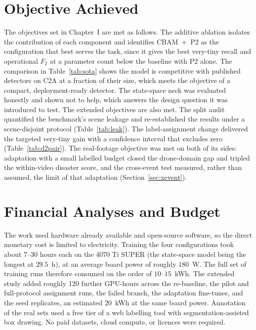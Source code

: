 \section{Objective Achieved}
The objectives set in Chapter~I are met as follows. The additive ablation isolates
the contribution of each component and identifies CBAM~+~P2 as the configuration
that best serves the task, since it gives the best very-tiny recall and operational
$F_2$ at a parameter count below the baseline with P2 alone. The comparison in
Table~\ref{tab:sota} shows the model is competitive with published detectors on C2A
at a fraction of their size, which meets the objective of a compact,
deployment-ready detector. The state-space neck was evaluated honestly and shown not
to help, which answers the design question it was introduced to test. The extended
objectives are also met. The split audit quantified the benchmark's scene leakage
and re-established the results under a scene-disjoint protocol
(Table~\ref{tab:leak}). The label-assignment change delivered the targeted
very-tiny gain with a confidence interval that excludes zero
(Table~\ref{tab:d2pair}). The real-footage objective was met on both of its
sides: adaptation with a small labelled budget closed the drone-domain gap and
tripled the within-video disaster score, and the cross-event test measured,
rather than assumed, the limit of that adaptation
(Section~\ref{sec:xevent}).

\section{Financial Analyses and Budget}
The work used hardware already available and open-source software, so the direct
monetary cost is limited to electricity. Training the four configurations took
about 7--30 hours each on the 4070 Ti SUPER (the state-space model being the
longest at $29.5$~h), at an average board power of roughly $180$~W. The full set of
training runs therefore consumed on the order of $10$--$15$~kWh. The extended
study added roughly 120 further GPU-hours across the re-baseline, the pilot and
full-protocol assignment runs, the failed branch, the adaptation fine-tunes, and
the seed replicates, an estimated $20$~kWh at the same board power. Annotation of
the real sets used a free tier of a web labelling tool with segmentation-assisted
box drawing. No paid datasets, cloud compute, or licences were required.

